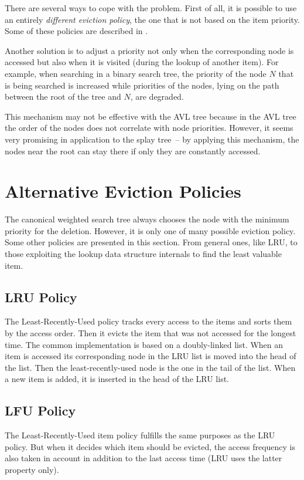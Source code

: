 There are several ways to cope with the problem. First of all, it is possible to use an entirely \emph{different eviction policy}, the one that is not based on the item priority. Some of these policies are described in .

Another solution is to adjust a priority not only when the corresponding node is accessed but also when it is visited (during the lookup of another item). For example, when searching in a binary search tree, the priority of the node $N$ that is being searched is increased while priorities of the nodes, lying on the path between the root of the tree and $N$, are degraded.

This mechanism may not be effective with the AVL tree because in the AVL tree the order of the nodes does not correlate with node priorities. However, it seems very promising in application to the splay tree~-- by applying this mechanism, the nodes near the root can stay there if only they are constantly accessed.

\section{Alternative Eviction Policies}
\label{sec:aep}
The canonical weighted search tree always chooses the node with the minimum priority for the deletion. However, it is only one of many possible eviction policy. Some other policies are presented in this section. From general ones, like LRU, to those exploiting the lookup data structure internals to find the least valuable item.

\subsection{LRU Policy}
\label{sssec:lru}
The Least-Recently-Used policy tracks every access to the items and sorts them by the access order. Then it evicts the item that was not accessed for the longest time. The common implementation is based on a doubly-linked list. When an item is accessed its corresponding node in the LRU list is moved into the head of the list. Then the least-recently-used node is the one in the tail of the list. When a new item is added, it is inserted in the head of the LRU list.

\subsection{LFU Policy}
\label{sssec:lfu}
The Least-Recently-Used item policy fulfills the same purposes as the LRU policy. But when it decides which item should be evicted, the access frequency is also taken in account in addition to the last access time (LRU uses the latter property only).

